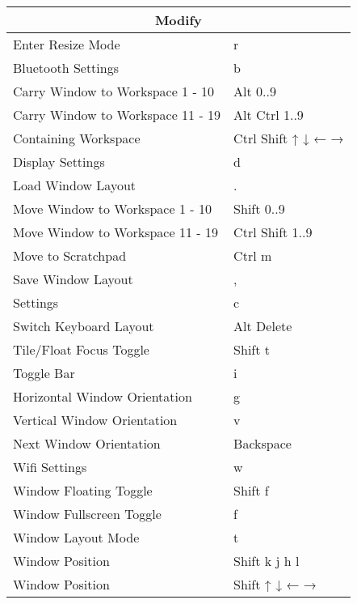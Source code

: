 \documentclass[12pt,paper=landscape,paper=a4]{scrartcl}
\begin{document}
\begin{multicols}{2}
    \begin{tabular}{ll}
         \multicolumn{2}{c}{Modify}\\
         \hline
         Enter Resize Mode                  & \faWindows{} r\\
         Bluetooth Settings                 & \faWindows{} b\\
         Carry Window to Workspace 1 - 10   & \faWindows{} Alt 0..9\\
         Carry Window to Workspace 11 - 19  & \faWindows{} Alt Ctrl 1..9\\
         Containing Workspace               & \faWindows{} Ctrl Shift ↑ ↓ ← →\\
         Display Settings                   & \faWindows{} d\\
         Load Window Layout                 & \faWindows{} .\\
         Move Window to Workspace 1 - 10    & \faWindows{} Shift 0..9\\
         Move Window to Workspace 11 - 19   & \faWindows{} Ctrl Shift 1..9\\
         Move to Scratchpad                 & \faWindows{} Ctrl m\\
         Save Window Layout                 & \faWindows{} ,\\
         Settings                           & \faWindows{} c\\
         Switch Keyboard Layout             & \faWindows{} Alt Delete\\
         Tile/Float Focus Toggle            & \faWindows{} Shift t\\
         Toggle Bar                         & \faWindows{} i\\
         Horizontal Window Orientation      & \faWindows{} g\\
         Vertical Window Orientation        & \faWindows{} v\\
         Next Window Orientation            & \faWindows{} Backspace\\
         Wifi Settings                      & \faWindows{} w\\
         Window Floating Toggle             & \faWindows{} Shift f\\
         Window Fullscreen Toggle           & \faWindows{} f\\
         Window Layout Mode                 & \faWindows{} t\\
         Window Position                    & \faWindows{} Shift k j h l\\
         Window Position                    & \faWindows{} Shift ↑ ↓ ← →
     \end{tabular}


\end{multicols}
\end{document}

